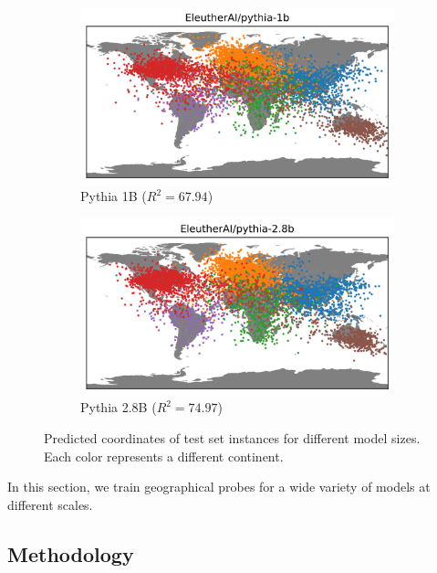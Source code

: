\begin{figure}[ht]
\begin{subfigure}[b]{0.48\textwidth}
         \includegraphics[trim={0 0 0 0.7cm},clip,width=\linewidth]{sources/part_1/geographical/imgs/pythia-1b.png}
         \caption{Pythia 1B ($R^2 = 67.94$)}
         \label{fig:1b_map}
    \end{subfigure}
    \begin{subfigure}[b]{0.48\textwidth}
         \includegraphics[trim={0 0 0 0.7cm},clip,width=\linewidth]{sources/part_1/geographical/imgs/pythia-2.8b.png}
         \caption{Pythia 2.8B ($R^2 = 74.97$)}
         \label{fig:2.8b_map}
    \end{subfigure}
    \caption{Predicted coordinates of test set instances for different model sizes. Each color represents a different continent.}
    \label{fig:maps}
\end{figure}

In this section, we train geographical probes for a wide variety of models at different scales.

\subsection{Methodology}

